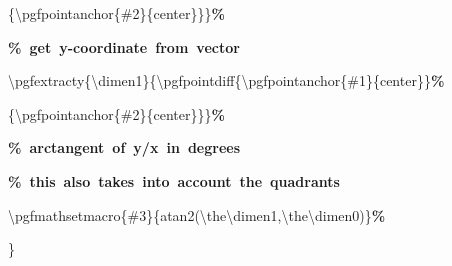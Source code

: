 {{\rule[-0.5ex]{0pt}{2.5ex}\hspace*{18.5em}\{\textbackslash{}pgfpointanchor\{\#2\}\{center\}\}\}\textcolor{G}{\textbf{\%}}\\
\rule[-0.5ex]{0pt}{2.5ex}\hspace*{1.0em}\textcolor{G}{\textbf{\%~get~y{-}coordinate~from~vector}}\\
\rule[-0.5ex]{0pt}{2.5ex}\hspace*{1.0em}\textbackslash{}pgfextracty\{\textbackslash{}dimen1\}\{\textbackslash{}pgfpointdiff\{\textbackslash{}pgfpointanchor\{\#1\}\{center\}\}\textcolor{G}{\textbf{\%}}\\
\rule[-0.5ex]{0pt}{2.5ex}\hspace*{18.5em}\{\textbackslash{}pgfpointanchor\{\#2\}\{center\}\}\}\textcolor{G}{\textbf{\%}}\\
\rule[-0.5ex]{0pt}{2.5ex}\hspace*{1.0em}\textcolor{G}{\textbf{\%~arctangent~of~y/x~in~degrees}}\\
\rule[-0.5ex]{0pt}{2.5ex}\hspace*{1.0em}\textcolor{G}{\textbf{\%~this~also~takes~into~account~the~quadrants}}\\
\rule[-0.5ex]{0pt}{2.5ex}\hspace*{1.0em}\textbackslash{}pgfmathsetmacro\{\#3\}\{atan2(\textbackslash{}the\textbackslash{}dimen1,\textbackslash{}the\textbackslash{}dimen0)\}\textcolor{G}{\textbf{\%}}\\
\rule[-0.5ex]{0pt}{2.5ex}\hspace*{0.0em}\}}%
}%
\endgroup
